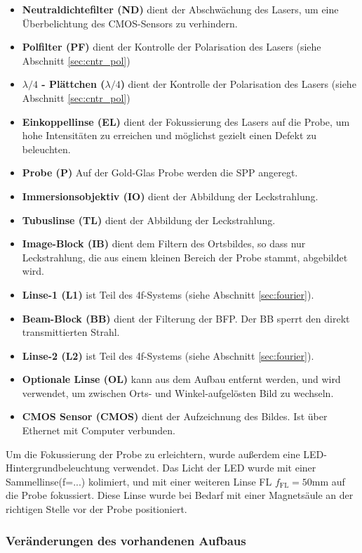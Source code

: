 \documentclass[titlepage]{article}
\begin{document}
		\begin{itemize}
			\item \textbf{Neutraldichtefilter (ND)} dient der Abschwächung des Lasers, um eine Überbelichtung des CMOS-Sensors zu verhindern.
			\item \textbf{Polfilter (PF)} dient der Kontrolle der Polarisation des Lasers (siehe Abschnitt \ref{sec:cntr_pol})
			\item \textbf{$\lambda / 4$ - Plättchen ($\lambda / 4$)} dient der Kontrolle der Polarisation des Lasers (siehe Abschnitt \ref{sec:cntr_pol})
			\item \textbf{Einkoppellinse (EL)} dient der Fokussierung des Lasers auf die Probe, um hohe Intensitäten zu erreichen und möglichst gezielt einen Defekt zu beleuchten.
			\item \textbf{Probe (P)} Auf der Gold-Glas Probe werden die SPP angeregt.
			\item \textbf{Immersionsobjektiv (IO)} dient der Abbildung der Leckstrahlung.
			\item \textbf{Tubuslinse (TL)} dient der Abbildung der Leckstrahlung.
			\item \textbf{Image-Block (IB)} dient dem Filtern des Ortsbildes, so dass nur Leckstrahlung, die aus einem kleinen Bereich der Probe stammt, abgebildet wird.			
			\item \textbf{Linse-1 (L1)} ist Teil des 4f-Systems (siehe Abschnitt \ref{sec:fourier}).
			\item \textbf{Beam-Block (BB)} dient der Filterung der BFP. Der BB sperrt den direkt transmittierten Strahl.			
			\item \textbf{Linse-2 (L2)} ist Teil des 4f-Systems (siehe Abschnitt \ref{sec:fourier}).
			\item \textbf{Optionale Linse (OL)} kann aus dem Aufbau entfernt werden, und wird verwendet, um zwischen Orts- und Winkel-aufgelösten Bild zu wechseln.
			\item \textbf{CMOS Sensor (CMOS)}  dient der Aufzeichnung des Bildes. Ist über Ethernet mit Computer verbunden.			
		\end{itemize}
		Um die Fokussierung der Probe zu erleichtern, wurde außerdem eine LED-Hintergrundbeleuchtung verwendet. Das Licht der LED wurde mit einer Sammellinse(f=...) kolimiert, und mit einer weiteren Linse FL $f_{\mathrm{FL}}=50\mathrm{mm}$ auf die  Probe fokussiert. Diese Linse wurde bei Bedarf mit einer Magnetsäule an der richtigen Stelle vor der Probe positioniert.
		
	\subsubsection{Veränderungen des vorhandenen Aufbaus}
\end{document}
